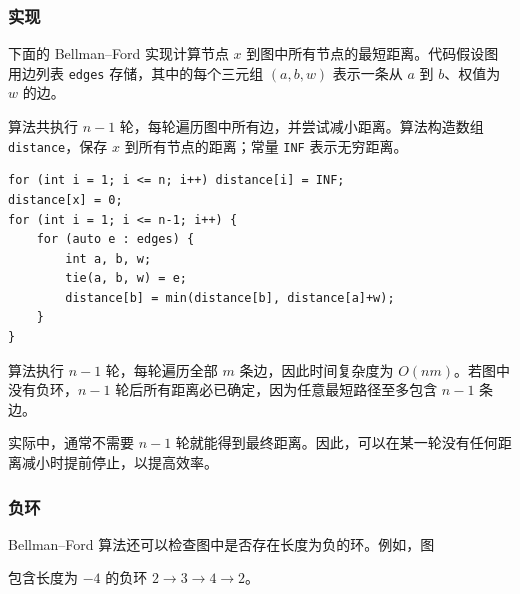 \subsubsection{实现}

下面的 Bellman--Ford 实现计算节点 $x$ 到图中所有节点的最短距离。代码假设图用边列表 \texttt{edges} 存储，其中的每个三元组 $(a,b,w)$ 表示一条从 $a$ 到 $b$、权值为 $w$ 的边。

算法共执行 $n-1$ 轮，每轮遍历图中所有边，并尝试减小距离。算法构造数组 \texttt{distance}，保存 $x$ 到所有节点的距离；常量 \texttt{INF} 表示无穷距离。

\begin{lstlisting}
for (int i = 1; i <= n; i++) distance[i] = INF;
distance[x] = 0;
for (int i = 1; i <= n-1; i++) {
    for (auto e : edges) {
        int a, b, w;
        tie(a, b, w) = e;
        distance[b] = min(distance[b], distance[a]+w);
    }
}
\end{lstlisting}

算法执行 $n-1$ 轮，每轮遍历全部 $m$ 条边，因此时间复杂度为 $O(nm)$。若图中没有负环，$n-1$ 轮后所有距离必已确定，因为任意最短路径至多包含 $n-1$ 条边。

实际中，通常不需要 $n-1$ 轮就能得到最终距离。因此，可以在某一轮没有任何距离减小时提前停止，以提高效率。

\subsubsection{负环}


Bellman--Ford 算法还可以检查图中是否存在长度为负的环。例如，图

\begin{center}
\end{center}
\noindent
包含长度为 $-4$ 的负环 $2 \rightarrow 3 \rightarrow 4 \rightarrow 2$。

